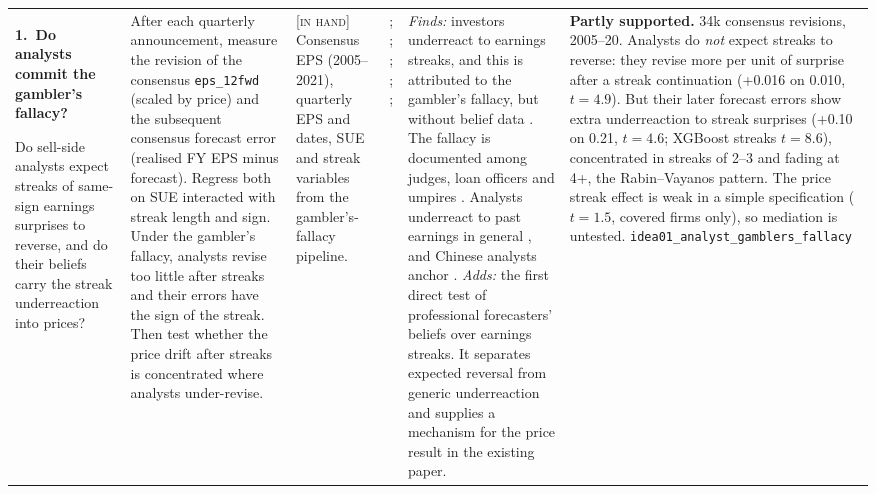 \documentclass[10pt]{article}
\newcommand{\idea}[2]{\textbf{#1.\ #2}\par\smallskip}
\newcommand{\inhand}{\textsc{[in hand]}}
\begin{document}
{\begin{longtable}{@{}L{3.2cm}L{4.4cm}L{2.5cm}L{3.0cm}L{5.4cm}L{5.8cm}@{}}
\idea{1}{Do analysts commit the gambler's fallacy?}
Do sell-side analysts expect streaks of same-sign earnings surprises to reverse, and do their beliefs carry the streak
underreaction into prices?
&
After each quarterly announcement, measure the revision of the consensus \texttt{eps\_12fwd} (scaled by price) and the
subsequent consensus forecast error (realised FY EPS minus forecast). Regress both on SUE interacted with streak
length and sign. Under the gambler's fallacy, analysts revise too little after streaks and their errors have the
sign of the streak. Then test whether the price drift after streaks is concentrated where analysts under-revise.
&
\inhand{} Consensus EPS (2005--2021), quarterly EPS and dates, SUE and streak variables from the gambler's-fallacy
pipeline.
&
\citet{loh2012}; \citet{rabin2010}; \citet{chen2016gf}; \citet{abarbanell1992}; \citet{mendenhall1991}; \citet{fan2024}
&
\emph{Finds:} investors underreact to earnings streaks, and this is attributed to the gambler's fallacy, but without
belief data \citep{loh2012}. The fallacy is documented among judges, loan officers and umpires \citep{chen2016gf}.
Analysts underreact to past earnings in general \citep{abarbanell1992}, and Chinese analysts anchor
\citep{fan2024}. \emph{Adds:} the first direct test of professional forecasters' beliefs over earnings streaks. It
separates expected reversal from generic underreaction and supplies a mechanism for the price result in the existing
paper.
&
\textbf{Partly supported.} 34k consensus revisions, 2005--20. Analysts do \emph{not} expect streaks to reverse: they revise more per unit of surprise after a streak continuation (+0.016 on 0.010, $t=4.9$). But their later forecast errors show extra underreaction to streak surprises (+0.10 on 0.21, $t=4.6$; XGBoost streaks $t=8.6$), concentrated in streaks of 2--3 and fading at 4+, the Rabin--Vayanos pattern. The price streak effect is weak in a simple specification ($t=1.5$, covered firms only), so mediation is untested. \texttt{idea01\_analyst\_gamblers\_fallacy}\\[4pt]


\end{longtable}}
\end{document}
